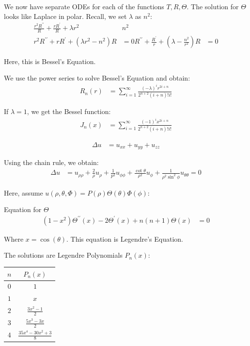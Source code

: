 \documentclass{article}
\begin{document}
We now have separate ODEs for each of the functions $T, R, \Theta$. The solution for $\Theta$ looks like Laplace in polar. Recall, we set $\lambda$ as $n^2$:
%
\begin{align}
  \frac{r^2 R^{\prime\prime}}{R} + \frac{r R^\prime}{R} + \lambda r^2 & n^2\\
  r^2 R^{\prime\prime} + rR^\prime + (\lambda r^2 - n^2)R & = 0
  R^{\prime\prime} + \frac{R^\prime}{r} + (\lambda - \frac{n^2}{r^2})R & = 0
\end{align}

Here, this is Bessel's Equation.

We use the power series to solve Bessel's Equation and obtain:
%
\begin{align}
  R_n(r) & = \sum^\infty_{i = 1} \frac{(-\lambda)^i r^{2i + n}}{2^{n + 2}(i + n)! i!}
\end{align}

If $\lambda = 1$, we get the Bessel function:
%
\begin{align}
  J_n(x) & = \sum^\infty_{i = 1} \frac{(-1)^i x^{2i + n}}{2^{n + 2}(i + n)! i!}
\end{align}

%
\begin{align}
  \Delta u & = u_{xx} + u_{yy} + u_{zz}
\end{align}

Using the chain rule, we obtain:
%
\begin{align}
  \Delta u & =
  u_{\rho \rho} +
  \frac{2}{\rho}u_\rho +
  \frac{1}{p^2} u_{\phi\phi} +
  \frac{\cot \theta}{\rho^2} u_\phi +
  \frac{1}{\rho^2 \sin^2 \phi} u_{\theta\theta} = 0
\end{align}

Here, assume $u(\rho, \theta, \Phi) = P(\rho)\Theta(\theta)\Phi(\phi)$:

Equation for $\Theta$
%
\begin{align}
  (1 - x^2) \Theta^{\prime\prime}(x) -
  2 \Theta^\prime(x) +
  n(n + 1) \Theta(x)
  & = 0
\end{align}

Where $x = \cos(\theta)$. This equation is Legendre's Equation.

The solutions are Legendre Polynomials $P_n(x)$:
%
\begin{center}
  \begin{tabular}{c|c}
    $n$ & $P_n(x)$\\
    \hline
    $0$ & $1$\\
    $1$ & $x$\\
    $2$ & $\frac{3x^2 - 1}{2}$\\
    $3$ & $\frac{5x^3 - 3x}{2}$\\
    $4$ & $\frac{35 x^4 - 30x^2 + 3}{8}$
  \end{tabular}
\end{center}
\end{document}
